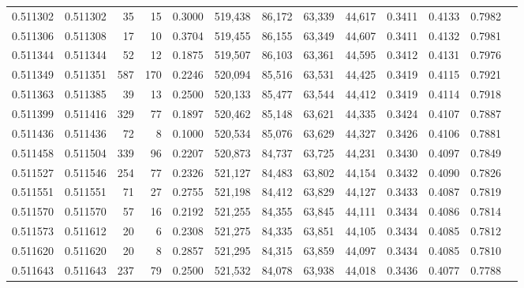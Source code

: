 \begin{tabular}{rrrrrrrrrrrrr}
0.511302 & 0.511302 &    35 &    15 &                                     0.3000 & 519,438 &  86,172 &  63,339 &  44,617 & 0.3411 & 0.4133 & 0.7982 \\
0.511306 & 0.511308 &    17 &    10 &                                     0.3704 & 519,455 &  86,155 &  63,349 &  44,607 & 0.3411 & 0.4132 & 0.7981 \\
0.511344 & 0.511344 &    52 &    12 &                                     0.1875 & 519,507 &  86,103 &  63,361 &  44,595 & 0.3412 & 0.4131 & 0.7976 \\
0.511349 & 0.511351 &   587 &   170 &                                     0.2246 & 520,094 &  85,516 &  63,531 &  44,425 & 0.3419 & 0.4115 & 0.7921 \\
0.511363 & 0.511385 &    39 &    13 &                                     0.2500 & 520,133 &  85,477 &  63,544 &  44,412 & 0.3419 & 0.4114 & 0.7918 \\
0.511399 & 0.511416 &   329 &    77 &                                     0.1897 & 520,462 &  85,148 &  63,621 &  44,335 & 0.3424 & 0.4107 & 0.7887 \\
0.511436 & 0.511436 &    72 &     8 &                                     0.1000 & 520,534 &  85,076 &  63,629 &  44,327 & 0.3426 & 0.4106 & 0.7881 \\
0.511458 & 0.511504 &   339 &    96 &                                     0.2207 & 520,873 &  84,737 &  63,725 &  44,231 & 0.3430 & 0.4097 & 0.7849 \\
0.511527 & 0.511546 &   254 &    77 &                                     0.2326 & 521,127 &  84,483 &  63,802 &  44,154 & 0.3432 & 0.4090 & 0.7826 \\
0.511551 & 0.511551 &    71 &    27 &                                     0.2755 & 521,198 &  84,412 &  63,829 &  44,127 & 0.3433 & 0.4087 & 0.7819 \\
0.511570 & 0.511570 &    57 &    16 &                                     0.2192 & 521,255 &  84,355 &  63,845 &  44,111 & 0.3434 & 0.4086 & 0.7814 \\
0.511573 & 0.511612 &    20 &     6 &                                     0.2308 & 521,275 &  84,335 &  63,851 &  44,105 & 0.3434 & 0.4085 & 0.7812 \\
0.511620 & 0.511620 &    20 &     8 &                                     0.2857 & 521,295 &  84,315 &  63,859 &  44,097 & 0.3434 & 0.4085 & 0.7810 \\
0.511643 & 0.511643 &   237 &    79 &                                     0.2500 & 521,532 &  84,078 &  63,938 &  44,018 & 0.3436 & 0.4077 & 0.7788 \\

\end{tabular}
